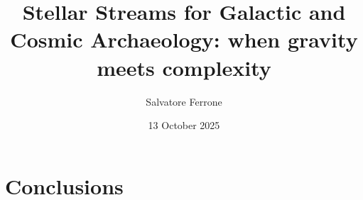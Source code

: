 \documentclass[a4paper,12pt,twoside]{book}
\title{Stellar Streams for Galactic and Cosmic Archaeology: when gravity meets complexity}
\institute{Observatoire de Paris-PSL, LIRA, UMR 8254 CNRS}
\author{Salvatore Ferrone}
\date{13 October 2025}
\begin{document}
\pslcover{}

\frontmatter
\AddResumeAbstract %

\begin{singlespace} %
 {}\adjustmtc
\tableofcontents\newpage
\renewcommand{\listfigurename}{List of Figures}
\listoffigures\adjustmtc %
\listoftables\adjustmtc %
\end{singlespace}

\mainmatter
\setcounter{page}{1}
% 

% 

% 

% 

% 

\chapter{Conclusions}


\backmatter
\appendix





\begin{singlespace}
\setlength{}
\small\printbibliography[heading=bibintoc,title=Bibliography]
\end{singlespace}
\end{document}
